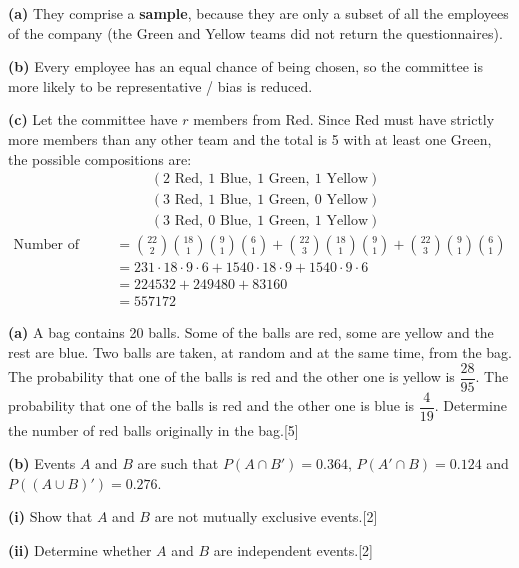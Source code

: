 \documentclass[a4paper,11pt,oneside]{article}
\newcommand{\Qhead}[1]{\par\needspace{14\baselineskip}\medskip\noindent{\large\bfseries #1}\par\smallskip}
\newcommand{\partlabel}[1]{\par\needspace{3\baselineskip}\smallskip\noindent\textbf{#1}\quad}
\newcommand{\mk}[1]{\hfill[#1]}
\begin{document}
\begin{solbox}
\partlabel{(a)}
They comprise a \textbf{sample}, because they are only a subset of all the employees of the company (the Green and Yellow teams did not return the questionnaires).
\partlabel{(b)}
Every employee has an equal chance of being chosen, so the committee is more likely to be representative / bias is reduced.
\partlabel{(c)}
Let the committee have $r$ members from Red. Since Red must have strictly more members than any other team and the total is 5 with at least one Green,
the possible compositions are:
\begin{align*}
&(2\text{ Red},\ 1\text{ Blue},\ 1\text{ Green},\ 1\text{ Yellow})\\
&(3\text{ Red},\ 1\text{ Blue},\ 1\text{ Green},\ 0\text{ Yellow})\\
&(3\text{ Red},\ 0\text{ Blue},\ 1\text{ Green},\ 1\text{ Yellow})
\end{align*}
\begin{align*}
\text{Number of ways}
&= \binom{22}{2}\binom{18}{1}\binom{9}{1}\binom{6}{1}
+ \binom{22}{3}\binom{18}{1}\binom{9}{1}
+ \binom{22}{3}\binom{9}{1}\binom{6}{1}\\
&= 231\cdot 18\cdot 9\cdot 6
+ 1540\cdot 18\cdot 9
+ 1540\cdot 9\cdot 6\\
&= 224532 + 249480 + 83160\\
&= 557172
\end{align*}
\end{solbox}
\clearpage
\Qhead{7}
\partlabel{(a)}
A bag contains 20 balls. Some of the balls are red, some are yellow and the rest are blue. Two balls are taken, at random and at the same time, from the bag. The probability that one of the balls is red and the other one is yellow is $\dfrac{28}{95}$. The probability that one of the balls is red and the other one is blue is $\dfrac{4}{19}$. Determine the number of red balls originally in the bag.\mk{5}



\partlabel{(b)}
Events $A$ and $B$ are such that $P(A\cap B')=0.364$, $P(A'\cap B)=0.124$ and $P((A\cup B)')=0.276$.

\partlabel{(i)}
Show that $A$ and $B$ are not mutually exclusive events.\mk{2}



\partlabel{(ii)}
Determine whether $A$ and $B$ are independent events.\mk{2}
\end{document}
